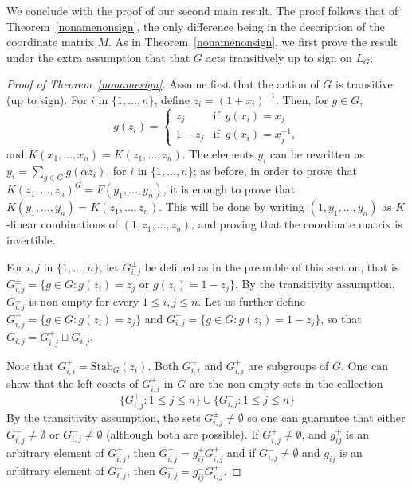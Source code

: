 \documentclass[12pt]{article}
\theoremstyle{plain}
\begin{document}
We conclude with the proof of our second main result.  The proof
follows that of Theorem~\ref{nonamenonsign}, the only difference being in
the description of the coordinate matrix $M$.  As in
Theorem~\ref{nonamenonsign}, we first prove the result under the extra
assumption that that $G$ acts transitively up to sign on $L_G$.

\begin{proof}[Proof of Theorem~\ref{nonamesign}]
  Assume first that the action of $G$ is transitive (up to sign).
  For $i$ in $\{1,\dots,n\}$, define $z_i = (1+x_i)^{-1} $. Then, for $g
  \in G$, $$g(z_i) = \begin{cases} z_j & \text{if} \,\,\, g(x_i) = x_j
    \\ 1-z_j & \text{if} \,\,\, g(x_i) = x_j^{-1},
  \end{cases}$$ 
  and $K(x_1, \ldots , x_n) = K(z_1, \ldots, z_n).$ The elements $y_i$
  can be rewritten as $y_i = \sum_{g \in G} g ({\alpha}z_i)$, for $i$
  in $\{1, \ldots, n\}$; as before, in order to prove that
  $K(z_1,\ldots, z_n)^G = F(y_1, \ldots, y_{n})$, it is enough to
  prove that $K(y_1,\dots,y_n)=K(z_1,\dots,z_n)$. This will be done by
  writing $(1,y_1,\dots,y_n)$ as $K$-linear combinations of
  $(1,z_1,\dots,z_n)$, and proving that the coordinate matrix is
  invertible.

  For $i,j$ in $\lbrace 1, \ldots , n \rbrace$, let $G^{\pm}_{i,j}$
  be defined as in the preamble of this section, that is 
  $G^{\pm}_{i,j}=\lbrace g \in G : g(z_i) = z_j \,\, \text{or} \,\, g(z_i) = 1-z_j
  \rbrace $. By the transitivity assumption, $G^{\pm}_{i,j}$ is
  non-empty for every $1 \leq i,j \leq n$. Let us further define $G^{+}_{i,j}
  = \lbrace g \in G : g(z_i) = z_j \rbrace$ and $G^{-}_{i,j} =
  \lbrace g \in G : g(z_i) = 1- z_j \rbrace$, so that $G_{i,j}=
  G^{+}_{i,j}\sqcup G^{-}_{i,j}$.  

Note that $G^+_{i,i}=\textrm{Stab}_G(z_i)$.  Both $G^{\pm}_{i,i}$ and $G^+_{i,i}$ are subgroups of $G$.  One can show that the left cosets of $G^+_{i,i}$ in $G$ are the non-empty sets in the collection
$$\{G^+_{i,j}:1\le j\le n\} \cup \{G^-_{i,j}: 1\le j\le n\}$$
By the transitivity assumption, the sets $G^{\pm}_{i,j}\ne \emptyset$
so one can guarantee that either $G^+_{i,j}\ne \emptyset$ or $G^-_{i,j}\ne \emptyset$ (although both are possible).  If $G^+_{i,j}\ne \emptyset$, and $g_{ij}^+$ is an arbitrary element of $G^+_{i,j}$, then 
$G^+_{i,j}=g_{ij}^+G^+_{i,j}$ and if $G^-_{i,j}\ne \emptyset$ and $g_{ij}^-$ is an arbitrary element of $G^-_{i,j}$, then 
$G^-_{i,j}=g_{ij}^-G^+_{i,j}$.
  

\end{proof}
\end{document}
